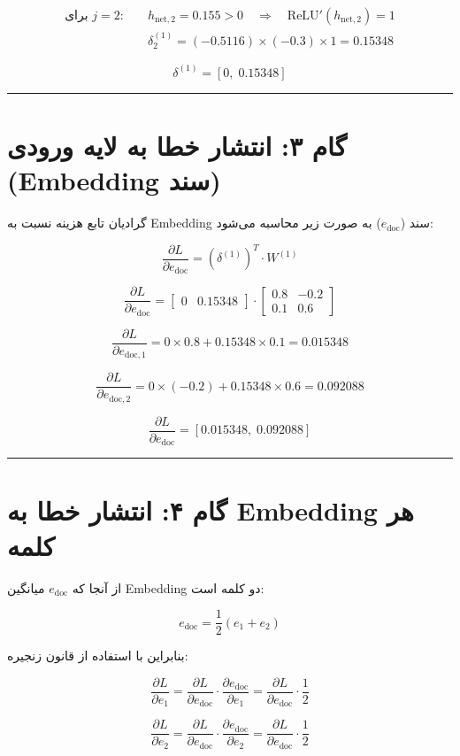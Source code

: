 \documentclass[11pt,a4paper]{article}
\newcommand{\en}[1]{\textenglish{#1}}
\newcommand{\separator}{\vspace{1em}\noindent\rule{\linewidth}{0.4pt}\vspace{1em}}
\begin{document}
\begin{align*}
\text{برای } j=2: &\quad h_{\text{net},2} = 0.155 > 0 \quad \Rightarrow \quad \text{ReLU}'(h_{\text{net},2}) = 1 \\
&\quad \delta^{(1)}_2 = (-0.5116) \times (-0.3) \times 1 = 0.15348
\end{align*}

\[
\delta^{(1)} = [0, \; 0.15348]
\]

\separator
\section{گام ۳: انتشار خطا به لایه ورودی (\en{Embedding} سند)}

گرادیان تابع هزینه نسبت به \en{Embedding} سند (\(e_{\text{doc}}\)) به صورت زیر محاسبه می‌شود:

\[
\frac{\partial L}{\partial e_{\text{doc}}} = (\delta^{(1)})^T \cdot W^{(1)}
\]

\[
\frac{\partial L}{\partial e_{\text{doc}}} = 
\begin{bmatrix}
0 & 0.15348
\end{bmatrix}
\cdot
\begin{bmatrix}
0.8 & -0.2 \\
0.1 & 0.6
\end{bmatrix}
\]

\[
\frac{\partial L}{\partial e_{\text{doc},1}} = 0 \times 0.8 + 0.15348 \times 0.1 = 0.015348
\]

\[
\frac{\partial L}{\partial e_{\text{doc},2}} = 0 \times (-0.2) + 0.15348 \times 0.6 = 0.092088
\]

\[
\frac{\partial L}{\partial e_{\text{doc}}} = [0.015348, \; 0.092088]
\]

\separator
\section{گام ۴: انتشار خطا به \en{Embedding} هر کلمه}

از آنجا که \(e_{\text{doc}}\) میانگین \en{Embedding} دو کلمه است:

\[
e_{\text{doc}} = \frac{1}{2}(e_1 + e_2)
\]

بنابراین با استفاده از قانون زنجیره:

\[
\frac{\partial L}{\partial e_1} = \frac{\partial L}{\partial e_{\text{doc}}} \cdot \frac{\partial e_{\text{doc}}}{\partial e_1} = \frac{\partial L}{\partial e_{\text{doc}}} \cdot \frac{1}{2}
\]

\[
\frac{\partial L}{\partial e_2} = \frac{\partial L}{\partial e_{\text{doc}}} \cdot \frac{\partial e_{\text{doc}}}{\partial e_2} = \frac{\partial L}{\partial e_{\text{doc}}} \cdot \frac{1}{2}
\]
\end{document}
